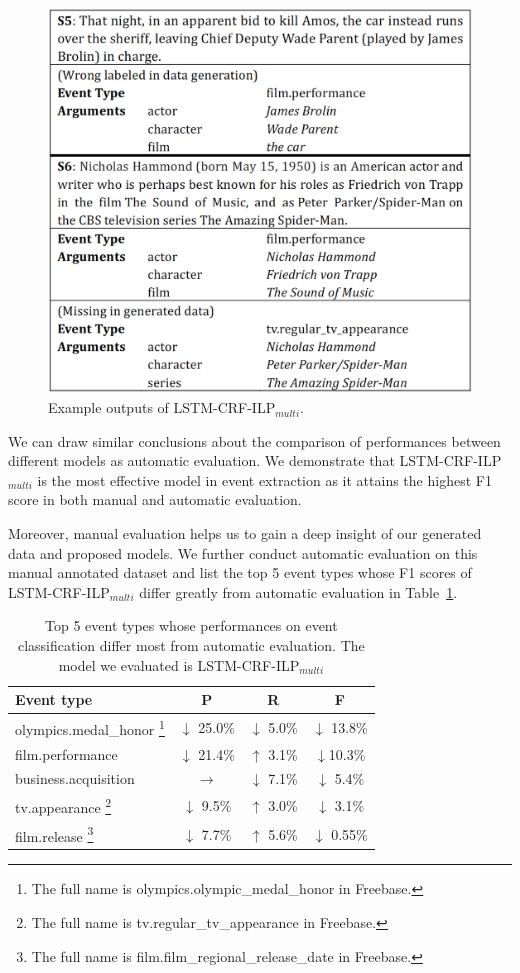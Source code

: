 \documentclass{article}
\begin{document}
\begin{figure}[h]
	\centering
	\includegraphics[width=.45\textwidth]{example.eps}
	\caption{Example outputs of LSTM-CRF-ILP$_{multi}$.\label{fig:1}}
\end{figure}

We can draw similar conclusions about the comparison of performances between different models as automatic evaluation. We demonstrate that LSTM-CRF-ILP$_{multi}$ is the most effective model in event extraction as it attains the highest F1 score in both manual and automatic evaluation.

Moreover, manual evaluation helps us to gain a deep insight of our generated data and proposed models. We further conduct automatic evaluation on this manual annotated dataset and list the top 5 event types whose F1 scores of LSTM-CRF-ILP$_{multi}$ differ greatly from automatic evaluation in Table~\ref{tab:4}. 

\begin{table}[h]
\centering
\begin{tabular}{|l|c|c|c|} \hline
	Event type & P & R & F \\ \hline
	olympics.medal\_honor \footnote{The full name is olympics.olympic\_medal\_honor in Freebase.} & $\downarrow$ 25.0\% & $\downarrow$ 5.0\% & $\downarrow$ 13.8\% \\ \hline
	film.performance & $\downarrow$ 21.4\% & $\uparrow$ 3.1\% & $\downarrow$10.3\% \\ \hline
	business.acquisition & $\rightarrow$ & $\downarrow$ 7.1\% & $\downarrow$ 5.4\% \\ \hline
	tv.appearance \footnote{The full name is tv.regular\_tv\_appearance in Freebase.} & $\downarrow$ 9.5\% & $\uparrow$ 3.0\% & $\downarrow$ 3.1\% \\ \hline
	film.release \footnote{The full name is film.film\_regional\_release\_date in Freebase.} & $\downarrow$ 7.7\% & $\uparrow$ 5.6\% & $\downarrow$ 0.55\% \\ \hline
\end{tabular}
\caption{Top 5 event types whose performances on event classification differ most from automatic evaluation. The model we evaluated is LSTM-CRF-ILP$_{multi}$ \label{tab:4}}
\end{table}
\end{document}
